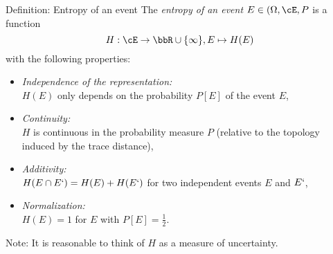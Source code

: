 \documentclass[
			print,
			a6paper,
			grid=none]{kartei}
\begin{document}
\begin{karte}{Definition: Entropy of an event}
	The \emph{entropy of an event $E\in (\Omega,\cE,P$} is a function 
	\begin{equation*}
		H:\cE\to\bbR\cup\{\infty\}, E\mapsto H(E)
	\end{equation*}
	with the following properties:
	\begin{itemize}
		\item	\emph{Independence of the representation:}\\ $H(E)$ only depends on the probability $P[E]$ of the event $E$,
		\item	\emph{Continuity:}\\ $H$ is continuous in the probability measure $P$ (relative to the topology induced by the trace distance),
		\item	\emph{Additivity:}\\ $H(E\cap E`)=H(E)+H(E`)$ for two independent events $E$ and $E`$,
		\item	\emph{Normalization:}\\ $H(E)=1$ for $E$ with $P[E]=\frac{1}{2}$.
	\end{itemize}

	Note: It is reasonable to think of $H$ as a measure of uncertainty.
\end{karte}
%
%
%
%
%
%
%
\end{document}
